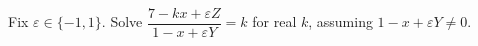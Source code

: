 Fix $\varepsilon\in\{-1,1\}$. Solve $\dfrac{7-kx+\varepsilon Z}{1-x+\varepsilon Y}=k$ for real $k$, assuming $1-x+\varepsilon Y\ne0$.
